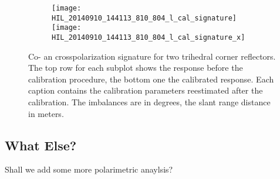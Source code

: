 \begin{figure*}[ht]
\begin{subfigure}[t]{\columnwidth}
			\texttt{[image: HIL\_20140910\_144113\_810\_804\_l\_cal\_signature]}
			\texttt{[image: HIL\_20140910\_144113\_810\_804\_l\_cal\_signature\_x]}
			\label{fig:pol_signatures:refl4}
		\end{subfigure}
		\caption{Co- an crosspolarization signature for two trihedral corner reflectors. The top row for each subplot shows the response before the calibration procedure, the bottom one the calibrated response. Each caption contains the calibration parameters reestimated after the calibration. The imbalances are in degrees, the slant range distance in meters.}
		\label{fig:pol_signatures}
\end{figure*}
\subsection{What Else?}
Shall we add some more polarimetric anaylsis?